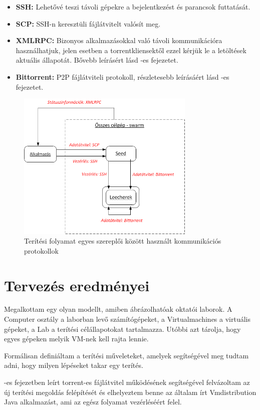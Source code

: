 \begin{itemize}
  \item \textbf{SSH}\cite{ylonen2006secure}\textbf{:} Lehetővé teszi távoli gépekre a bejelentkezést és parancsok futtatását.
  \item \textbf{SCP}\cite{pechanec2007scp}\textbf{:} SSH-n keresztüli fájlátvitelt  valósít meg.
  \item \textbf{XMLRPC:} Bizonyos alkalmazásokkal való távoli kommunikációra használhatjuk, jelen esetben a torrentkliensektől ezzel kérjük le a letöltések aktuális állapotát. Bővebb leírásért lásd -es fejezetet.
  \item \textbf{Bittorrent:} P2P fájlátviteli protokoll, részletesebb leírásáért lásd -es fejezetet.
\end{itemize}

\begin{figure}[ht]
	\centering
	\includegraphics[width=85mm, keepaspectratio]{figures/design_protocols.png}
	\caption{Terítési folyamat egyes szereplői között használt kommunikációs protokollok}
	\label{fig:designprotocols}
\end{figure}

\section{Tervezés eredményei}
Megalkottam egy olyan modellt, amiben ábrázolhatóak oktatói laborok. A Computer osztály a laborban levő számítógépeket, a Virtualmachines a virtuális gépeket, a Lab a terítési célállapotokat tartalmazza. Utóbbi azt tárolja, hogy egyes gépeken melyik VM-nek kell rajta lennie.

Formálisan definiáltam a terítési műveleteket, amelyek segítségével meg tudtam adni, hogy milyen lépéseket takar egy terítés.

-es fejezetben leírt torrent-es fájlátvitel működésének segítségével felvázoltam az új terítési megoldás felépítését és elhelyeztem benne az általam írt Vmdistribution Java alkalmazást, ami az egész folyamat vezérléséért felel.